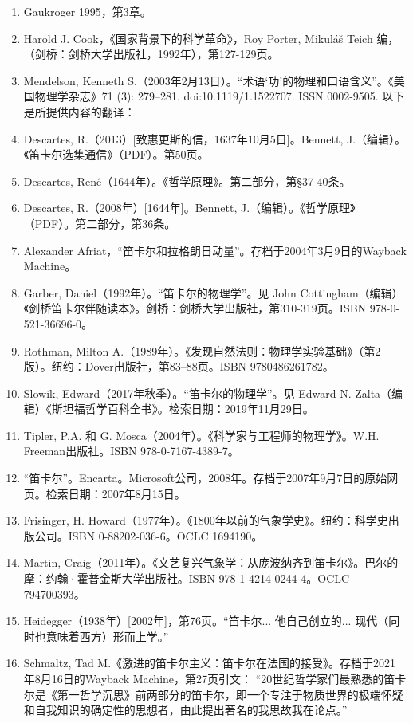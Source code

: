 \begin{enumerate}
\item Gaukroger 1995，第3章。
\item Harold J. Cook，《国家背景下的科学革命》，Roy Porter, Mikuláš Teich 编，（剑桥：剑桥大学出版社，1992年），第127-129页。
\item Mendelson, Kenneth S.（2003年2月13日）。“术语‘功’的物理和口语含义”。《美国物理学杂志》71 (3): 279–281. doi:10.1119/1.1522707. ISSN 0002-9505.
以下是所提供内容的翻译：
\item Descartes, R.（2013）[致惠更斯的信，1637年10月5日]。Bennett, J.（编辑）。《笛卡尔选集通信》（PDF）。第50页。
\item Descartes, René（1644年）。《哲学原理》。第二部分，第§37-40条。
\item Descartes, R.（2008年）[1644年]。Bennett, J.（编辑）。《哲学原理》（PDF）。第二部分，第36条。
\item Alexander Afriat，“笛卡尔和拉格朗日动量”。存档于2004年3月9日的Wayback Machine。
\item Garber, Daniel（1992年）。“笛卡尔的物理学”。见 John Cottingham（编辑）《剑桥笛卡尔伴随读本》。剑桥：剑桥大学出版社，第310-319页。ISBN 978-0-521-36696-0。
\item Rothman, Milton A.（1989年）。《发现自然法则：物理学实验基础》（第2版）。纽约：Dover出版社，第83–88页。ISBN 9780486261782。
\item Slowik, Edward（2017年秋季）。“笛卡尔的物理学”。见 Edward N. Zalta（编辑）《斯坦福哲学百科全书》。检索日期：2019年11月29日。
\item Tipler, P.A. 和 G. Mosca（2004年）。《科学家与工程师的物理学》。W.H. Freeman出版社。ISBN 978-0-7167-4389-7。
\item “笛卡尔”。Encarta。Microsoft公司，2008年。存档于2007年9月7日的原始网页。检索日期：2007年8月15日。
\item Frisinger, H. Howard（1977年）。《1800年以前的气象学史》。纽约：科学史出版公司。ISBN 0-88202-036-6。OCLC 1694190。
\item Martin, Craig（2011年）。《文艺复兴气象学：从庞波纳齐到笛卡尔》。巴尔的摩：约翰·霍普金斯大学出版社。ISBN 978-1-4214-0244-4。OCLC 794700393。
\item Heidegger（1938年）[2002年]，第76页。“笛卡尔... 他自己创立的... 现代（同时也意味着西方）形而上学。”
\item Schmaltz, Tad M.《激进的笛卡尔主义：笛卡尔在法国的接受》。存档于2021年8月16日的Wayback Machine，第27页引文：
“20世纪哲学家们最熟悉的笛卡尔是《第一哲学沉思》前两部分的笛卡尔，即一个专注于物质世界的极端怀疑和自我知识的确定性的思想者，由此提出著名的我思故我在论点。”

\end{enumerate}
